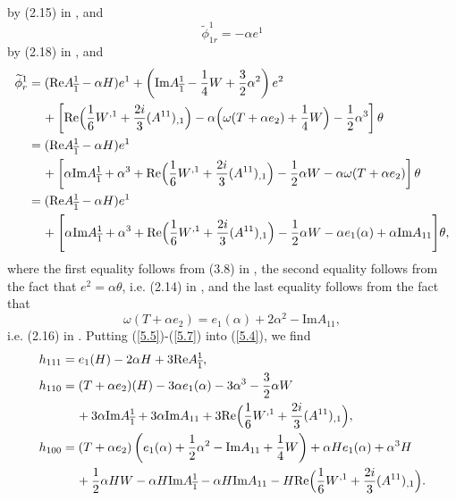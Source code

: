 \documentclass{amsart}
\theoremstyle{Corollary}
\numberwithin{equation}{section}
\begin{document}
by (2.15) in \cite{CYZ}, and
\begin{equation}\label{5.6}
\widetilde{\phi}^1_{1r}=-\alpha e^1
\end{equation}
by (2.18) in \cite{CYZ}, and 
\begin{equation}\label{5.7}
\begin{split}
\widetilde{\phi}^1_r
&=(\mbox{Re} A^1_{\overline{1}}-\alpha H) e^1+\left(\mbox{Im} A^1_{\overline{1}}-\frac{1}{4}W+\frac{3}{2}\alpha^2\right)e^2\\
&\hspace{4mm}+\left[\mbox{Re}\Big(\frac{1}{6}W^{,1}+\frac{2i}{3}(A^{11})_{,1}\Big)-\alpha\Big(\omega(T+\alpha e_2)+\frac{1}{4}W\Big)-\frac{1}{2}\alpha^3\right]\theta\\
&=(\mbox{Re} A^1_{\overline{1}}-\alpha H) e^1\\
&\hspace{4mm}+\left[
\alpha \mbox{Im} A^1_{\overline{1}}+\alpha^3+
\mbox{Re}\Big(\frac{1}{6}W^{,1}+\frac{2i}{3}(A^{11})_{,1}\Big)
-\frac{1}{2}\alpha W
-\alpha \omega(T+\alpha e_2)  \right]\theta\\
&=(\mbox{Re} A^1_{\overline{1}}-\alpha H) e^1\\
&\hspace{4mm}+
\Bigg[\alpha \mbox{Im} A^1_{\overline{1}}+\alpha^3+
\mbox{Re}\Big(\frac{1}{6}W^{,1}+\frac{2i}{3}(A^{11})_{,1}\Big)
-\frac{1}{2}\alpha W-\alpha e_1(\alpha)+\alpha \mbox{Im} A_{11}\Bigg]\theta,
\end{split}
\end{equation}
where the first equality follows from (3.8) in \cite{CYZ}, 
the second equality follows from the fact that $e^2=\alpha\theta$, i.e. (2.14) in \cite{CYZ},
and the last equality follows from the fact that 
$$\omega(T+\alpha e_2)=e_1(\alpha)+2\alpha^2-\mbox{Im} A_{11},$$
i.e. (2.16) in \cite{CYZ}.  
Putting (\ref{5.5})-(\ref{5.7}) into (\ref{5.4}), we find 
\begin{equation}\label{5.8}
\begin{split}
h_{111}&=e_1(H)-2\alpha H+3 \mbox{Re} A^1_{\overline{1}},\\
h_{110}&=(T+\alpha e_2)(H)-3\alpha e_1(\alpha)-3\alpha^3-\frac{3}{2}\alpha W\\
&\hspace{4mm}+3\alpha \mbox{Im} A^1_{\overline{1}}+3\alpha \mbox{Im} A_{11}
+3
\mbox{Re}\Big(\frac{1}{6}W^{,1}+\frac{2i}{3}(A^{11})_{,1}\Big),\\
h_{100}&=(T+\alpha e_2)\left(e_1(\alpha)+\frac{1}{2}\alpha^2-\mbox{Im} A_{11}+\frac{1}{4}W\right)+\alpha H e_1(\alpha)+\alpha^3 H\\
&\hspace{4mm}+\frac{1}{2}\alpha HW-\alpha H \mbox{Im} A^1_{\overline{1}}-\alpha H \mbox{Im}A_{11}
-H\mbox{Re}\Big(\frac{1}{6}W^{,1}+\frac{2i}{3}(A^{11})_{,1}\Big).
\end{split}
\end{equation}
\end{document}
